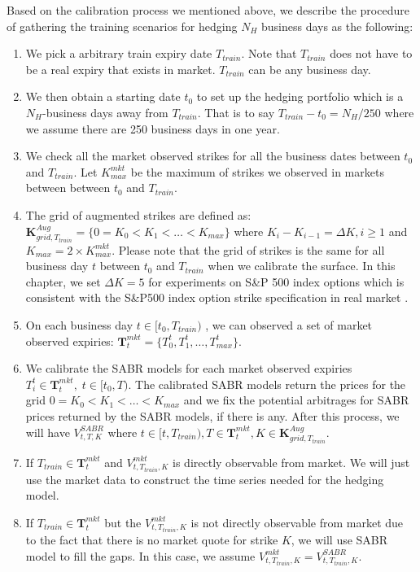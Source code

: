 \documentclass[letterpaper,12pt,titlepage,oneside,final]{book}
\numberwithin{equation}{section}
\theoremstyle{definition}
\newcommand{\Vmkt}{V^{mkt}}
\begin{document}
Based on the calibration process we mentioned above, we describe the procedure of gathering the training scenarios for hedging $N_H$ business days  as the following:
\begin{enumerate}
	\item We pick a arbitrary train expiry date $T_{train}$. Note that  $T_{train}$ does not have to be a real expiry that exists in market. $T_{train}$ can be any business day.
	\item We then obtain  a starting date  $t_0$ to set up the hedging portfolio which is  a $N_H$-business days away from $T_{train}$. That is to say $T_{train}-t_0=N_H/250$ where we assume there are 250 business days in one year. 
	\item We check all the market observed strikes for all the business dates between $t_0$ and  $T_{train}$. Let $K^{mkt}_{max}$ be the maximum of  strikes we observed in markets between between $t_0$ and  $T_{train}$. 
	\item  The grid of augmented strikes are defined as: $\mathbf{K}^{Aug}_{grid,T_{train}}=\{0=K_0<K_1<\dots<K_{max}\}$ where $K_i-K_{i-1}=\Delta K, i \geq 1$ and $K_{max}=2 \times K^{mkt}_{max}$. Please note that the grid of strikes is the same for all business day $t$ between  $t_0$ and  $T_{train}$ when we calibrate the surface. In this chapter, we set $\Delta K=5$ for experiments on S\&P 500 index options which is consistent with the S\&P500 index option strike specification in real market \cite{hull2006options}.
	\item On each business day $t \in [t_0,T_{train})$ , we can observed a set of market observed expiries: $\mathbf{T}_t^{mkt}=\{T_0^{t},T_1^{t},\dots,T_{max}^{t}\}$.
	
	
	\item  We calibrate the SABR models for each market observed expiries $T_i^{t} \in \mathbf{T}_t^{mkt},	\;  t \in [t_0, T)$. The calibrated SABR models return the prices  for the grid $0=K_0<K_1<\dots<K_{max}$ and we fix the potential arbitrages for SABR prices returned by the SABR models, if there is any. After this process, we will have $V^{SABR}_{t,T,K}$ where $ t \in [t,T_{train}), T \in \mathbf{T}_t^{mkt}, K \in \mathbf{K}^{Aug}_{grid,T_{train}}$.
	\item If $T_{train} \in \mathbf{T}_t^{mkt}$ and $\Vmkt_{t,T_{train},K}$ is directly observable from market. 
	We will just use the market data to construct the time series needed for the hedging model. 
	
	\item If $T_{train} \in \mathbf{T}_t^{mkt}$ but  the 
	$\Vmkt_{t,T_{train},K}$ is not directly observable from market due to the fact that there is no market quote for strike $K$, we will use SABR model to fill the gaps. In this case, we assume  $\Vmkt_{t,T_{train},K}=V^{SABR}_{t,T_{train},K}$.
	

\end{enumerate}
\end{document}
